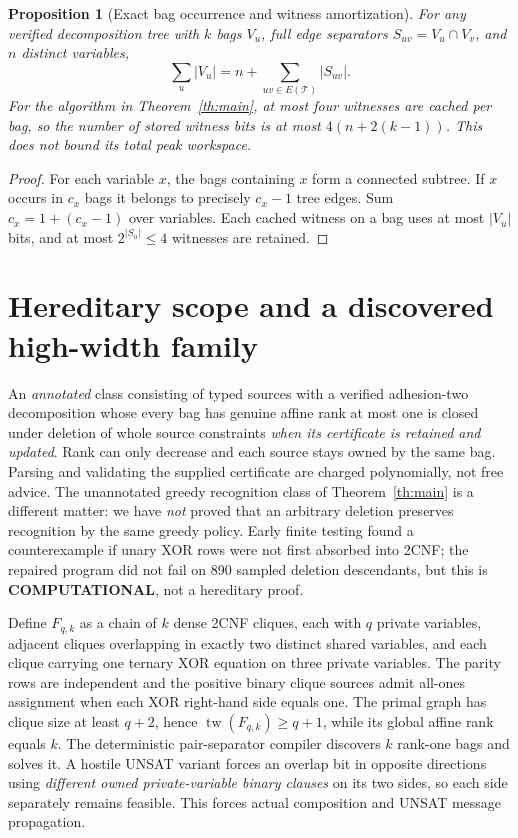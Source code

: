 \documentclass[10pt]{article}
\newtheorem{proposition}[theorem]{Proposition}
\newcommand{\tw}{\operatorname{tw}}
\begin{document}
\begin{proposition}[Exact bag occurrence and witness amortization]\label{prop:bags}
For any verified decomposition tree with $k$ bags $V_u$, full edge separators $S_{uv}=V_u\cap V_v$, and $n$ distinct variables,
\[
 \boxed{\sum_{u}|V_u|=n+\sum_{uv\in E(\mathcal T)}|S_{uv}|.}
\]
For the algorithm in Theorem~\ref{th:main}, at most four witnesses are cached per bag, so the number of stored witness \emph{bits} is at most $4(n+2(k-1))$. This does not bound its total peak workspace.
\end{proposition}
\begin{proof}For each variable $x$, the bags containing $x$ form a connected subtree. If $x$ occurs in $c_x$ bags it belongs to precisely $c_x-1$ tree edges. Sum $c_x=1+(c_x-1)$ over variables. Each cached witness on a bag uses at most $|V_u|$ bits, and at most $2^{|S_u|}\le4$ witnesses are retained.\end{proof}

\section{Hereditary scope and a discovered high-width family}
An \emph{annotated} class consisting of typed sources with a verified adhesion-two decomposition whose every bag has genuine affine rank at most one is closed under deletion of whole source constraints \emph{when its certificate is retained and updated}. Rank can only decrease and each source stays owned by the same bag. Parsing and validating the supplied certificate are charged polynomially, not free advice. The unannotated greedy recognition class of Theorem~\ref{th:main} is a different matter: we have \emph{not} proved that an arbitrary deletion preserves recognition by the same greedy policy. Early finite testing found a counterexample if unary XOR rows were not first absorbed into 2CNF; the repaired program did not fail on 890 sampled deletion descendants, but this is \textbf{COMPUTATIONAL}, not a hereditary proof.

Define $F_{q,k}$ as a chain of $k$ dense 2CNF cliques, each with $q$ private variables, adjacent cliques overlapping in exactly two distinct shared variables, and each clique carrying one ternary XOR equation on three private variables. The parity rows are independent and the positive binary clique sources admit all-ones assignment when each XOR right-hand side equals one. The primal graph has clique size at least $q+2$, hence $\tw(F_{q,k})\ge q+1$, while its global affine rank equals $k$. The deterministic pair-separator compiler discovers $k$ rank-one bags and solves it. A hostile UNSAT variant forces an overlap bit in opposite directions using \emph{different owned private-variable binary clauses} on its two sides, so each side separately remains feasible. This forces actual composition and UNSAT message propagation.
\end{document}
